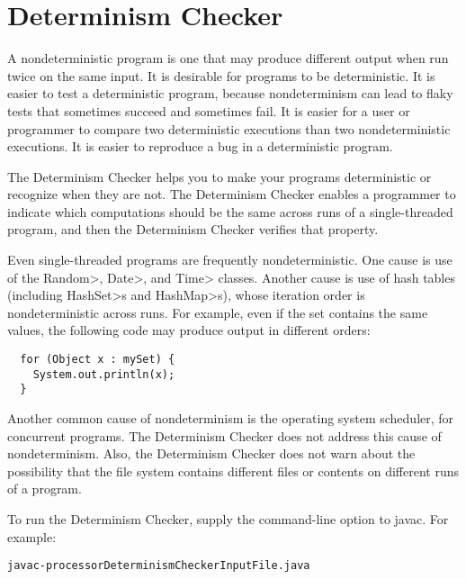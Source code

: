 \htmlhr
\chapter{Determinism Checker\label{determinism-checker}}

A nondeterministic program is one that may produce different output when
run twice on the same input.
It is desirable for programs to be deterministic.
It is easier to test a deterministic program,
because nondeterminism can lead to flaky tests that sometimes succeed and
sometimes fail.  It is easier for a user or programmer to compare two
deterministic executions than two nondeterministic executions.  It is
easier to reproduce a bug in a deterministic program.

The Determinism Checker helps you to make your programs deterministic or
recognize when they are not.
The Determinism Checker enables a programmer to indicate which
computations should be the same across runs of a single-threaded program,
and then the Determinism Checker verifies that property.

Even single-threaded programs are frequently nondeterministic.
One cause is use of the \<Random>, \<Date>, and \<Time> classes.
Another cause is use of hash tables (including \<HashSet>s and
\<HashMap>s), whose iteration order is nondeterministic across runs.
For example, even if the set contains the same values, the following code
may produce output in different orders:

\begin{Verbatim}
  for (Object x : mySet) {
    System.out.println(x);
  }
\end{Verbatim}

Another common cause of nondeterminism is the operating system scheduler,
for concurrent programs.  The Determinism Checker does not address this
cause of nondeterminism.  Also, the Determinism Checker does not warn
about the possibility that the file system contains different files or
contents on different runs of a program.

To run the Determinism Checker, supply the
command-line option to javac.
For example:

\begin{alltt}
  javac -processor DeterminismChecker InputFile.java
\end{alltt}



